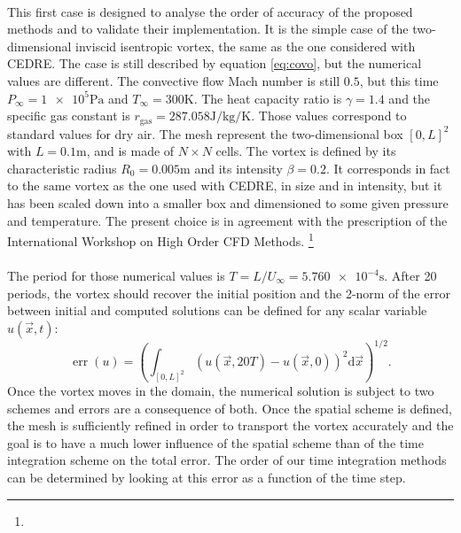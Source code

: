       \paragraph{}
      This first case is designed to analyse the order of accuracy of the proposed methods and to validate their implementation.
      It is the simple case of the two-dimensional inviscid isentropic vortex, the same as the one considered with CEDRE.
      The case is still described by equation \ref{eq:covo}, but the numerical values are different.
      The convective flow Mach number is still $0.5$, but this time $P_\infty = \num{1e5}\si{\pascal}$ and $T_\infty = 300\si{\kelvin}$.
      The heat capacity ratio is $\gamma = 1.4$ and the specific gas constant is $r_\textrm{gas} = 287.058\si{\joule\per\kilo\gram\per\kelvin}$.
      Those values correspond to standard values for dry air.
      The mesh represent the two-dimensional box $\left[0, L\right]^2$ with $L = 0.1\si{\meter}$, and is made of $N \times N$ cells.
      The vortex is defined by its characteristic radius $R_0 = 0.005\si{\meter}$ and its intensity $\beta = 0.2$.
      It corresponds in fact to the same vortex as the one used with CEDRE, in size and in intensity, but it has been scaled down into a smaller box and dimensioned to some given pressure and temperature.
      The present choice is in agreement with the prescription of the International Workshop on High Order CFD Methods.
      \footnote{}

      \paragraph{}
      The period for those numerical values is $T = L / U_\infty = \num{5.760e-4}\si{\second}$.
      After 20 periods, the vortex should recover the initial position and the 2-norm of the error between initial and computed solutions can be defined for any scalar variable $u\left(\vec{x}, t\right)$:
      \begin{equation}
        \operatorname{err}\left(u\right) = \left(\int_{\left[0, L\right]^2} \left(u\left(\vec{x}, 20T\right) - u\left(\vec{x}, 0\right)\right)^2 \mathrm{d}\vec{x} \right)^{1/2} .
      \end{equation}
      Once the vortex moves in the domain, the numerical solution is subject to two schemes and errors are a consequence of both.
      Once the spatial scheme is defined, the mesh is sufficiently refined in order to transport the vortex accurately and the goal is to have a much lower influence of the spatial scheme than of the time integration scheme on the total error.
      The order of our time integration methods can be determined by looking at this error as a function of the time step.

